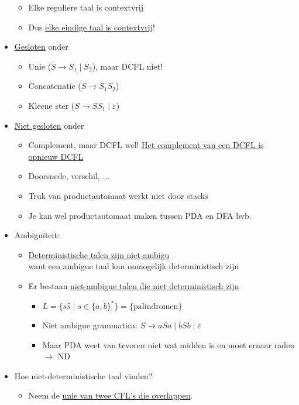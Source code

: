 \documentclass[kulak]{kulakarticle}
\let\epsilon\varepsilon
\theoremstyle{definition}
\begin{document}
\begin{itemize}
\begin{itemize}
			\item Elke reguliere taal is contextvrij
			\item Dus \underline{elke eindige taal is contextvrij}!
		\end{itemize}
		\item \underline{Gesloten} onder \begin{itemize}
			\item Unie (\(S \rightarrow S_1\mid S_2\)), maar DCFL niet!
			\item Concatenatie (\(S \rightarrow S_1S_2\))
			\item Kleene ster (\(S \rightarrow SS_1 \mid \epsilon\))
		\end{itemize}
		\item \underline{Niet gesloten} onder \begin{itemize}
			\item Complement, maar DCFL wel! \underline{Het complement van een DCFL is opnieuw DCFL}
			\item Doorsnede, verschil, ...
			\item Truk van productautomaat werkt niet door stacks
			\item Je kan wel productautomaat maken tussen PDA en DFA bvb.
		\end{itemize}
		\item Ambiguïteit: \begin{itemize}
			\item \underline{Deterministische talen zijn niet-ambigu}\\
			want een ambigue taal kan onmogelijk deterministisch zijn
			\item Er bestaan \underline{niet-ambigue talen die niet deterministisch zijn} \begin{itemize}
				\item \(L=\{s\hat{s} \mid s\in\{a,b\}^*\}=\{\text{palindromen}\}\)
				\item Niet ambigue grammatica: \(S \rightarrow aSa \mid bSb \mid \epsilon\)
				\item Maar PDA weet van tevoren niet wat midden is en moet ernaar raden \(\rightarrow\) ND
			\end{itemize}
		\end{itemize}
		\newpage
		\item Hoe niet-deterministische taal vinden? \begin{itemize}
			\item Neem de \underline{unie van twee CFL's die overlappen}. \begin{itemize}

\end{itemize}
\end{itemize}
\end{itemize}
\end{document}
